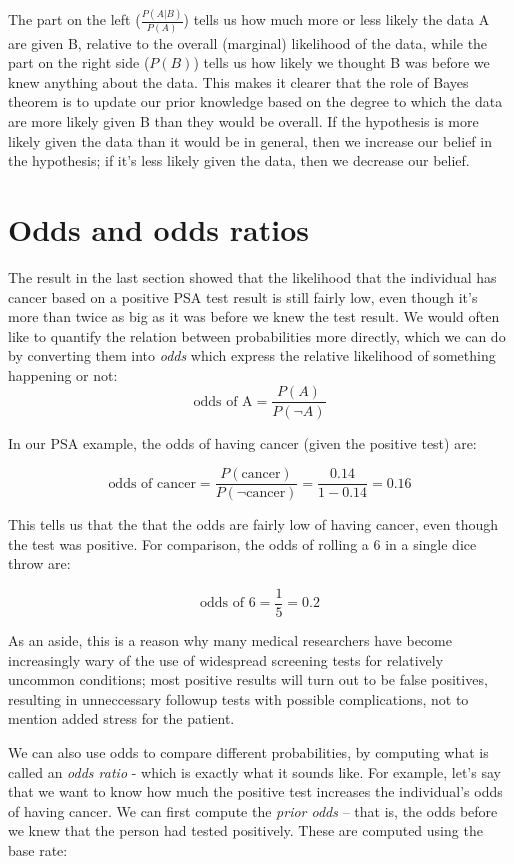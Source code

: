 \documentclass[12pt,]{book}
\theoremstyle{definition}
\theoremstyle{definition}
\theoremstyle{definition}
\theoremstyle{remark}
\begin{document}
The part on the left (\(\frac{P(A|B)}{P(A)}\)) tells us how much more or less likely the data A are given B, relative to the overall (marginal) likelihood of the data, while the part on the right side (\(P(B)\)) tells us how likely we thought B was before we knew anything about the data. This makes it clearer that the role of Bayes theorem is to update our prior knowledge based on the degree to which the data are more likely given B than they would be overall. If the hypothesis is more likely given the data than it would be in general, then we increase our belief in the hypothesis; if it's less likely given the data, then we decrease our belief.

\hypertarget{odds-and-odds-ratios}{%
\section{Odds and odds ratios}\label{odds-and-odds-ratios}}

The result in the last section showed that the likelihood that the individual has cancer based on a positive PSA test result is still fairly low, even though it's more than twice as big as it was before we knew the test result. We would often like to quantify the relation between probabilities more directly, which we can do by converting them into \emph{odds} which express the relative likelihood of something happening or not:\\
\[
\text{odds of A} = \frac{P(A)}{P(\neg A)}
\]

In our PSA example, the odds of having cancer (given the positive test) are:

\[
\text{odds of cancer} = \frac{P(\text{cancer})}{P(\neg \text{cancer})} =\frac{0.14}{1 - 0.14} = 0.16
\]

This tells us that the that the odds are fairly low of having cancer, even though the test was positive. For comparison, the odds of rolling a 6 in a single dice throw are:

\[
\text{odds of 6} = \frac{1}{5} = 0.2
\]

As an aside, this is a reason why many medical researchers have become increasingly wary of the use of widespread screening tests for relatively uncommon conditions; most positive results will turn out to be false positives, resulting in unneccessary followup tests with possible complications, not to mention added stress for the patient.

We can also use odds to compare different probabilities, by computing what is called an \emph{odds ratio} - which is exactly what it sounds like. For example, let's say that we want to know how much the positive test increases the individual's odds of having cancer. We can first compute the \emph{prior odds} -- that is, the odds before we knew that the person had tested positively. These are computed using the base rate:
\end{document}
